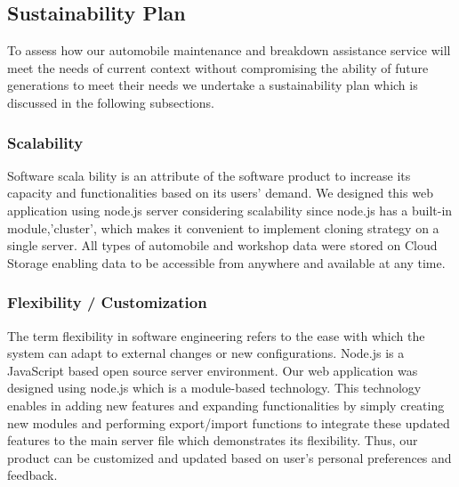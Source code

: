 \documentclass[11pt]{article} %
\begin{document}
	\subsection{Sustainability Plan}
	To assess how our automobile maintenance and breakdown assistance service will meet the needs of current context without compromising the ability of future generations to meet their needs we undertake a sustainability plan which is discussed in the following subsections.
	\begin{subs}
		\subsubsection{Scalability}
	    Software scala
	    bility is an attribute of the software product to increase its capacity and functionalities based on its users' demand. We designed this web application using node.js server considering scalability since node.js has a built-in module,'cluster', which makes it convenient to implement cloning strategy on a single server. All types of automobile and workshop data were stored on Cloud Storage enabling data to be accessible from anywhere and available at any time.
		
		\subsubsection{Flexibility / Customization}
		The term flexibility in software engineering refers to the ease with which the system can adapt to external changes or new configurations. Node.js is a JavaScript based open source server environment. Our web application was designed using node.js which is a module-based technology. This technology enables in adding new features and expanding functionalities by simply creating new modules and performing export/import functions to integrate these updated features to the main server file which demonstrates its flexibility. Thus, our product can be customized and updated based on user's personal preferences and feedback. \\
	\end{subs}
\end{document}
